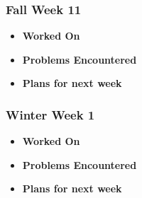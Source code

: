 \documentclass[compsoc,draftclsnofoot,onecolumn,10pt]{IEEEtran}
\begin{document}
\subsubsection{Fall Week 11}
\begin{itemize}
    \item {\textbf{Worked On}}
    \begin{itemize}
        
    \end{itemize}

    \item {\textbf{Problems Encountered}}
    \begin{itemize}
        
    \end{itemize}

    \item{\textbf{Plans for next week}}
    \begin{itemize}
        
    \end{itemize}

\end{itemize}

\subsubsection{Winter Week 1}
\begin{itemize}
    \item {\textbf{Worked On}}
    \begin{itemize}
        
    \end{itemize}

    \item {\textbf{Problems Encountered}}
    \begin{itemize}
        
    \end{itemize}

    \item{\textbf{Plans for next week}}
    \begin{itemize}
        
    \end{itemize}

\end{itemize}
\end{document}
